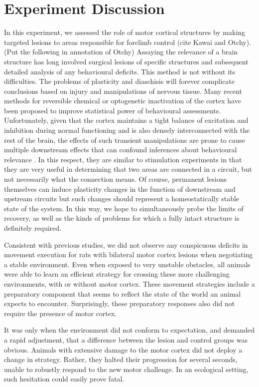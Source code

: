 \section{Experiment Discussion}

In this experiment, we assessed the role of motor cortical structures by making targeted lesions to areas responsible for forelimb control (cite Kawai and Otchy). (Put the following in annotation of Otchy) Assaying the relevance of a brain structure has long involved surgical lesions of specific structures and subsequent detailed analysis of any behavioural deficits. This method is not without its difficulties. The problems of plasticity and diaschisis will forever complicate conclusions based on injury and manipulations of nervous tissue. Many recent methods for reversible chemical or optogenetic inactivation of the cortex have been proposed to improve statistical power of behavioural assessments. Unfortunately, given that the cortex maintains a tight balance of excitation and inhibition during normal functioning and is also densely interconnected with the rest of the brain, the effects of such transient manipulations are prone to cause multiple downstream effects that can confound inferences about behavioural relevance \cite{Otchy2015}. In this respect, they are similar to stimulation experiments in that they are very useful in determining that two areas are connected in a circuit, but not necessarily what the connection means. Of course, permanent lesions themselves can induce plasticity changes in the function of downstream and upstream circuits but such changes should represent a homeostatically stable state of the system. In this way, we hope to simultaneously probe the limits of recovery, as well as the kinds of problems for which a fully intact structure is definitely required.

Consistent with previous studies, we did not observe any conspicuous deficits in movement execution for rats with bilateral motor cortex lesions when negotiating a stable environment. Even when exposed to very unstable obstacles, all animals were able to learn an efficient strategy for crossing these more challenging environments, with or without motor cortex. These movement strategies include a preparatory component that seems to reflect the state of the world an animal expects to encounter. Surprisingly, these preparatory responses also did not require the presence of motor cortex.

It was only when the environment did not conform to expectation, and demanded a rapid adjustment, that a difference between the lesion and control groups was obvious. Animals with extensive damage to the motor cortex did not deploy a change in strategy. Rather, they halted their progression for several seconds, unable to robustly respond to the new motor challenge. In an ecological setting, such hesitation could easily prove fatal.

